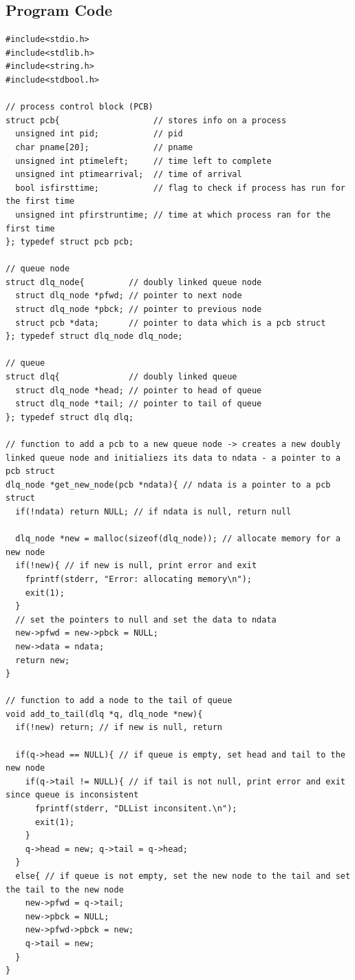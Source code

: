 \documentclass{article}
\theoremstyle{mytheoremstyle}
\theoremstyle{mytheoremstyle}
\theoremstyle{myproblemstyle}
\begin{document}
\newpage
\subsection{Program Code}
\begin{lstlisting}
#include<stdio.h>
#include<stdlib.h>
#include<string.h>
#include<stdbool.h>

// process control block (PCB)
struct pcb{                   // stores info on a process
  unsigned int pid;           // pid
  char pname[20];             // pname
  unsigned int ptimeleft;     // time left to complete
  unsigned int ptimearrival;  // time of arrival
  bool isfirsttime;           // flag to check if process has run for the first time
  unsigned int pfirstruntime; // time at which process ran for the first time
}; typedef struct pcb pcb;

// queue node
struct dlq_node{         // doubly linked queue node
  struct dlq_node *pfwd; // pointer to next node
  struct dlq_node *pbck; // pointer to previous node
  struct pcb *data;      // pointer to data which is a pcb struct
}; typedef struct dlq_node dlq_node;

// queue
struct dlq{              // doubly linked queue
  struct dlq_node *head; // pointer to head of queue
  struct dlq_node *tail; // pointer to tail of queue
}; typedef struct dlq dlq;

// function to add a pcb to a new queue node -> creates a new doubly linked queue node and initialiezs its data to ndata - a pointer to a pcb struct
dlq_node *get_new_node(pcb *ndata){ // ndata is a pointer to a pcb struct
  if(!ndata) return NULL; // if ndata is null, return null

  dlq_node *new = malloc(sizeof(dlq_node)); // allocate memory for a new node
  if(!new){ // if new is null, print error and exit
    fprintf(stderr, "Error: allocating memory\n");
    exit(1);
  }
  // set the pointers to null and set the data to ndata
  new->pfwd = new->pbck = NULL;
  new->data = ndata;
  return new;
}

// function to add a node to the tail of queue
void add_to_tail(dlq *q, dlq_node *new){
  if(!new) return; // if new is null, return

  if(q->head == NULL){ // if queue is empty, set head and tail to the new node
    if(q->tail != NULL){ // if tail is not null, print error and exit since queue is inconsistent
      fprintf(stderr, "DLList inconsitent.\n");
      exit(1);
    }
    q->head = new; q->tail = q->head;
  }
  else{ // if queue is not empty, set the new node to the tail and set the tail to the new node
    new->pfwd = q->tail;
    new->pbck = NULL;
    new->pfwd->pbck = new;
    q->tail = new;
  }
}


\end{lstlisting}
\end{document}
